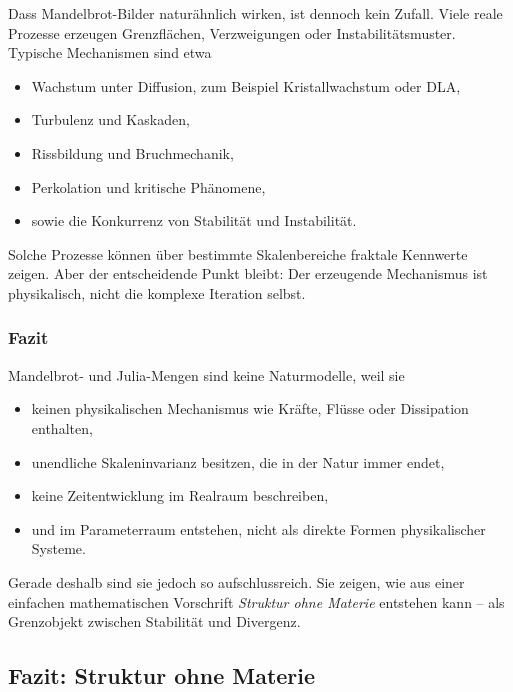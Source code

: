 Dass Mandelbrot-Bilder naturähnlich wirken,
ist dennoch kein Zufall.
Viele reale Prozesse erzeugen Grenzflächen, Verzweigungen oder Instabilitätsmuster.
Typische Mechanismen sind etwa
\begin{itemize}
\item Wachstum unter Diffusion, zum Beispiel Kristallwachstum oder DLA,
\item Turbulenz und Kaskaden,
\item Rissbildung und Bruchmechanik,
\item Perkolation und kritische Phänomene,
\item sowie die Konkurrenz von Stabilität und Instabilität.
\end{itemize}

Solche Prozesse können über bestimmte Skalenbereiche
fraktale Kennwerte zeigen.
Aber der entscheidende Punkt bleibt:
Der erzeugende Mechanismus ist physikalisch,
nicht die komplexe Iteration selbst.

\subsubsection*{Fazit}

Mandelbrot- und Julia-Mengen sind keine Naturmodelle, weil sie
\begin{itemize}
\item keinen physikalischen Mechanismus wie Kräfte, Flüsse oder Dissipation enthalten,
\item unendliche Skaleninvarianz besitzen, die in der Natur immer endet,
\item keine Zeitentwicklung im Realraum beschreiben,
\item und im Parameterraum entstehen, nicht als direkte Formen physikalischer Systeme.
\end{itemize}

Gerade deshalb sind sie jedoch so aufschlussreich.
Sie zeigen,
wie aus einer einfachen mathematischen Vorschrift
\emph{Struktur ohne Materie} entstehen kann --
als Grenzobjekt zwischen Stabilität und Divergenz.


\subsection{Fazit: Struktur ohne Materie}
\label{sec:7.7}

